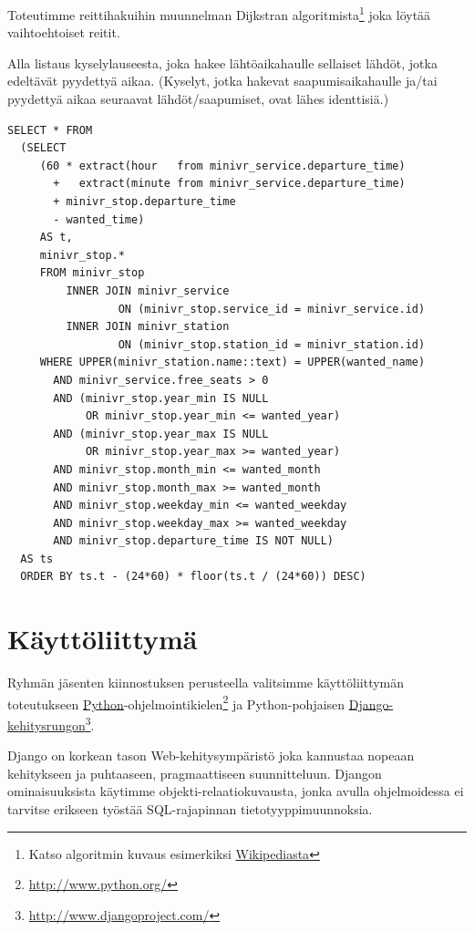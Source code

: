 \documentclass[a4paper,twoside,titlepage,12pt]{article}
\begin{document}
Toteutimme reittihakuihin muunnelman Dĳkstran algoritmista\footnote{Katso algoritmin kuvaus esimerkiksi \href{http://fi.wikipedia/Dijkstran\_algoritmi}{Wikipediasta}} joka löytää vaihtoehtoiset reitit.

Alla listaus kyselylauseesta, joka hakee lähtöaikahaulle sellaiset lähdöt,
jotka edeltävät pyydettyä aikaa. (Kyselyt, jotka hakevat saapumisaikahaulle
ja/tai pyydettyä aikaa seuraavat lähdöt/saapumiset, ovat lähes identtisiä.)

\lstset{language=SQL,caption=Eräs alkupisteet hakeva kyselylause.}
\begin{lstlisting}
SELECT * FROM
  (SELECT
     (60 * extract(hour   from minivr_service.departure_time)
       +   extract(minute from minivr_service.departure_time)
       + minivr_stop.departure_time
       - wanted_time)
     AS t,
     minivr_stop.*
     FROM minivr_stop
         INNER JOIN minivr_service
                 ON (minivr_stop.service_id = minivr_service.id)
         INNER JOIN minivr_station
                 ON (minivr_stop.station_id = minivr_station.id)
     WHERE UPPER(minivr_station.name::text) = UPPER(wanted_name)
       AND minivr_service.free_seats > 0
       AND (minivr_stop.year_min IS NULL
            OR minivr_stop.year_min <= wanted_year)
       AND (minivr_stop.year_max IS NULL
            OR minivr_stop.year_max >= wanted_year)
       AND minivr_stop.month_min <= wanted_month
       AND minivr_stop.month_max >= wanted_month
       AND minivr_stop.weekday_min <= wanted_weekday
       AND minivr_stop.weekday_max >= wanted_weekday
       AND minivr_stop.departure_time IS NOT NULL)
  AS ts
  ORDER BY ts.t - (24*60) * floor(ts.t / (24*60)) DESC)
\end{lstlisting}

\section{Käyttöliittymä}

Ryhmän jäsenten kiinnostuksen perusteella valitsimme käyttöliittymän toteutukseen \href{http://www.python.org/}{Python}-ohjelmointikielen\footnote{\url{http://www.python.org/}} ja Python-pohjaisen \href{http://www.djangoproject.com/}{Django-kehitysrungon}\footnote{\url{http://www.djangoproject.com/}}.

Django on korkean tason Web-kehitysympäristö joka kannustaa nopeaan kehitykseen ja puhtaaseen, pragmaattiseen suunnitteluun. Djangon ominaisuuksista käytimme objekti-relaatiokuvausta, jonka avulla ohjelmoidessa ei tarvitse erikseen työstää SQL-rajapinnan tietotyyppimuunnoksia.
\end{document}
